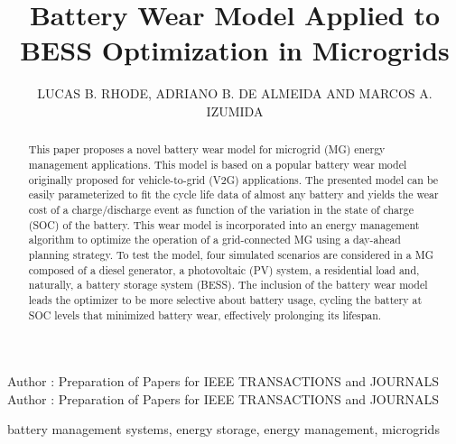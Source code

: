 \documentclass{ieeeaccess}
\begin{document}

\title{Battery Wear Model Applied to BESS Optimization in Microgrids}

\author{
	\uppercase{Lucas B. Rhode},
	\uppercase{Adriano B. de Almeida}
	\uppercase{and Marcos A. Izumida}
}
\address[1]{Sustainable Energies Center, CERTI Foundation, Brazil (e-mail: lrh@certi.org.br)}
\address[2]{Western Parana State University, Brazil (e-mail: adriano.almeida@unioeste.br)}
\address[3]{Sustainable Energies Center, CERTI Foundation, Brazil (e-mail: mlz@certi.org.br)}

\markboth
{Author \headeretal: Preparation of Papers for IEEE TRANSACTIONS and JOURNALS}
{Author \headeretal: Preparation of Papers for IEEE TRANSACTIONS and JOURNALS}


\begin{abstract}
    This paper proposes a novel battery wear model for microgrid (MG) energy management applications. This model is based on a popular battery wear model originally proposed for vehicle-to-grid (V2G) applications. The presented model can be easily parameterized to fit the cycle life data of almost any battery and yields the wear cost of a charge/discharge event as function of the variation in the state of charge (SOC) of the battery. This wear model is incorporated into an energy management algorithm to optimize the operation of a grid-connected MG using a day-ahead planning strategy. To test the model, four simulated scenarios are considered in a MG composed of a diesel generator, a photovoltaic (PV) system, a residential load and, naturally, a battery storage system (BESS). The inclusion of the battery wear model leads the optimizer to be more selective about battery usage, cycling the battery at SOC levels that minimized battery wear, effectively prolonging its lifespan.
\end{abstract}

\begin{keywords}
    battery management systems, energy storage, energy management, microgrids
\end{keywords}

\titlepgskip=-15pt

\maketitle
\end{document}
